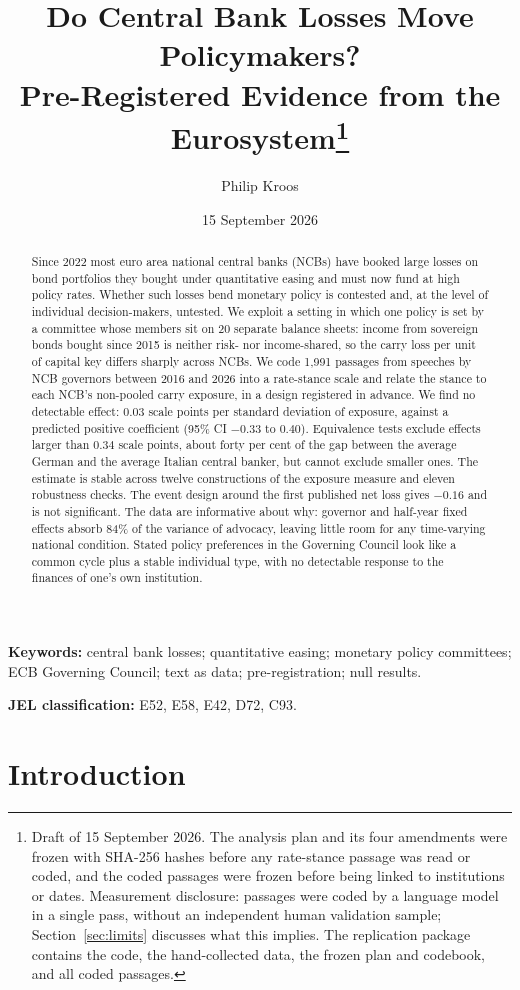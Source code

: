 \documentclass[11pt]{article}
\title{\bfseries Do Central Bank Losses Move Policymakers?\\[2pt]
\large Pre-Registered Evidence from the Eurosystem\thanks{Draft of 15 September 2026. The analysis plan and its four amendments were frozen with SHA-256 hashes before any rate-stance passage was read or coded, and the coded passages were frozen before being linked to institutions or dates. Measurement disclosure: passages were coded by a language model in a single pass, without an independent human validation sample; Section~\ref{sec:limits} discusses what this implies. The replication package contains the code, the hand-collected data, the frozen plan and codebook, and all coded passages.}}
\author{Philip Kroos}
\date{15 September 2026}
\theoremstyle{plain}
\begin{document}
\maketitle

\begin{abstract}\noindent\normalsize
Since 2022 most euro area national central banks (NCBs) have booked large losses on bond portfolios they bought under quantitative easing and must now fund at high policy rates. Whether such losses bend monetary policy is contested and, at the level of individual decision-makers, untested. We exploit a setting in which one policy is set by a committee whose members sit on 20 separate balance sheets: income from sovereign bonds bought since 2015 is neither risk- nor income-shared, so the carry loss per unit of capital key differs sharply across NCBs. We code 1{,}991 passages from speeches by NCB governors between 2016 and 2026 into a rate-stance scale and relate the stance to each NCB's non-pooled carry exposure, in a design registered in advance. We find no detectable effect: $0.03$ scale points per standard deviation of exposure, against a predicted positive coefficient (95\% CI $-0.33$ to $0.40$). Equivalence tests exclude effects larger than $0.34$ scale points, about forty per cent of the gap between the average German and the average Italian central banker, but cannot exclude smaller ones. The estimate is stable across twelve constructions of the exposure measure and eleven robustness checks. The event design around the first published net loss gives $-0.16$ and is not significant. The data are informative about why: governor and half-year fixed effects absorb 84\% of the variance of advocacy, leaving little room for any time-varying national condition. Stated policy preferences in the Governing Council look like a common cycle plus a stable individual type, with no detectable response to the finances of one's own institution.
\end{abstract}

\vspace{0.6em}
\noindent\textbf{Keywords:} central bank losses; quantitative easing; monetary policy committees; ECB Governing Council; text as data; pre-registration; null results.

\vspace{0.3em}
\noindent\textbf{JEL classification:} E52, E58, E42, D72, C93.

\clearpage

\section{Introduction}
\end{document}
